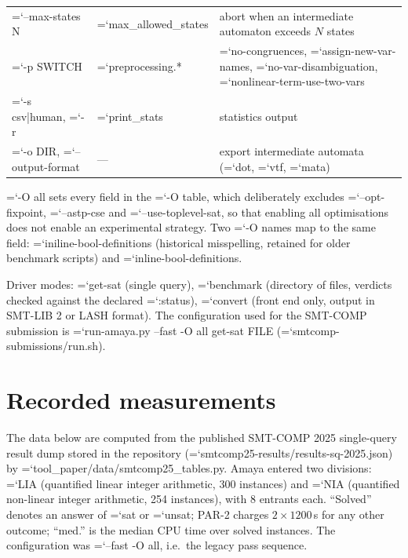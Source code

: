 \documentclass[10pt,a4paper]{article}
\newcommand{\amaya}{Amaya}
\newcommand{\code}[1]{{\small\ttfamily\hyphenchar\font=`\-\relax #1}}
\begin{document}
\begin{center}
\begin{tabular}{p{34mm}p{44mm}p{66mm}}
\code{--max-states N} & \code{max\_allowed\_states} & abort when an intermediate automaton exceeds $N$ states \\
\code{-p SWITCH} & \code{preprocessing.*} & \code{no-congruences}, \code{assign-new-var-names}, \code{no-var-disambiguation}, \code{nonlinear-term-use-two-vars} \\
\code{-s csv|\allowbreak human}, \code{-r} & \code{print\_stats} & statistics output \\
\code{-o DIR}, \code{--output-format} & --- & export intermediate automata (\code{dot}, \code{vtf}, \code{mata}) \\
\bottomrule
\end{tabular}
\end{center}

\code{-O all} sets every field in the \code{-O} table, which deliberately excludes
\code{--opt-fixpoint}, \code{--astp-cse} and \code{--use-toplevel-sat}, so that enabling all
optimisations does not enable an experimental strategy.  Two \code{-O} names map to the same field:
\code{iniline-bool-definitions} (historical misspelling, retained for older benchmark scripts) and
\code{inline-bool-definitions}.

Driver modes: \code{get-sat} (single query), \code{benchmark} (directory of files, verdicts checked
against the declared \code{:status}), \code{convert} (front end only, output in SMT-LIB 2 or LASH
format).  The configuration used for the SMT-COMP submission is
\code{run-amaya.\allowbreak py --fast -O all get-sat FILE} (\code{smtcomp-submissions/run.sh}).

\section{Recorded measurements}
\label{sec:measurements}

The data below are computed from the published SMT-COMP 2025 single-query result dump stored in the
repository (\code{smtcomp25-results/results-sq-2025.json}) by
\code{tool\_\allowbreak paper/data/smtcomp25\_\allowbreak tables.py}.  \amaya{} entered two divisions: \code{LIA} (quantified
linear integer arithmetic, 300 instances) and \code{NIA} (quantified non-linear integer arithmetic, 254
instances), with 8 entrants each.  ``Solved'' denotes an answer of \code{sat} or \code{unsat}; PAR-2
charges $2 \times 1200$\,s for any other outcome; ``med.'' is the median CPU time over solved
instances.  The configuration was \code{--fast -O all}, i.e.\ the legacy pass sequence.
\end{document}

